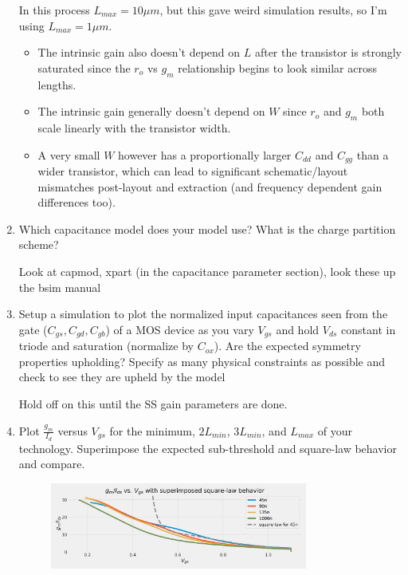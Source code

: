 \begin{enumerate}
    In this process $L_{max} = 10 \mu m$, but this gave weird simulation results, so I'm using $L_{max} = 1 \mu m$.
    \begin{itemize}
        \item The intrinsic gain also doesn't depend on $L$ after the transistor is strongly saturated since the $r_o$ vs $g_m$ relationship begins to look similar across lengths.
        \item The intrinsic gain generally doesn't depend on $W$ since $r_o$ and $g_m$ both scale linearly with the transistor width.
        \item A very small $W$ however has a proportionally larger $C_{dd}$ and $C_{gg}$ than a wider transistor, which can lead to significant schematic/layout mismatches post-layout and extraction (and frequency dependent gain differences too).
    \end{itemize}

\item {\color{blue}Which capacitance model does your model use? What is the charge partition scheme?}

    Look at capmod, xpart (in the capacitance parameter section), look these up the bsim manual

\item {\color{blue}Setup a simulation to plot the normalized input capacitances seen from the gate ($C_{gs}, C_{gd}, C_{gb}$) of a MOS device as you vary $V_{gs}$ and hold $V_{ds}$ constant in triode and saturation (normalize by $C_{ox}$). Are the expected symmetry properties upholding? Specify as many physical constraints as possible and check to see they are upheld by the model}

    Hold off on this until the SS gain parameters are done.

\item {\color{blue}Plot $\frac{g_m}{I_d}$ versus $V_{gs}$ for the minimum, $2 L_{min}$, $3 L_{min}$, and $L_{max}$ of your technology. Superimpose the expected sub-threshold and square-law behavior and compare.}

    \begin{figure}[H]
        \centering
        \includegraphics[width=0.8\textwidth]{figs/problem8.png}
    \end{figure}


\end{enumerate}
